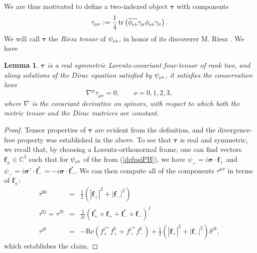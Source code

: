 \documentclass[11pt]{article}
\newtheorem{lem}[thm]{Lemma}
\theoremstyle{definition}
\DeclareMathOperator{\tr}{tr}
\newcommand{\refeq}[1]{(\ref{#1})}
\numberwithin{equation}{section}
\newcommand{\beff}{\mathbf{f}}
\newcommand{\btau}{\boldsymbol{\tau}}
\newcommand{\beq}{\begin{equation}}
\newcommand{\eeq}{\end{equation}}
\newcommand{\siV}{\boldsymbol{\sigma}}
\newcommand{\psiPH}{{\psi_{\mbox{\rm\tiny ph}}}}
\newcommand{\phiPH}{{\phi_{\mbox{\rm\tiny ph}}}}
\newcommand{\Cset}{{\mathbb C}}
\newcommand{\de}{\delta}
\newcommand{\ga}{\gamma}
\newcommand{\half}{\frac{1}{2}}
\newcommand{\bna}{\begin{eqnarray}}
\newcommand{\ena}{\end{eqnarray}}
\begin{document}
 We are thus motivated to define a two-indexed object $\boldsymbol{\tau}$ with components
\beq \label{def:tau}
\tau_{\mu\nu} := \frac{1}{4}\tr\left( \overline{\phiPH} \ga_\mu \phiPH \ga_\nu \right).
\eeq
 We will call $\btau$ the {\em Riesz tensor} of $\psiPH$, in honor of its discoverer M. Riesz \cite{Rie1946}.  
 We have
%
\begin{lem}
$\boldsymbol{\tau}$ is a real symmetric Lorentz-covariant four-tensor of rank two, and along solutions of the Dirac equation satisfied by $\psiPH$, 
it satisfies the conservation laws
\beq \label{taudivfree}
\nabla^\mu \tau_{\mu\nu} = 0,\qquad \nu = 0,1,2,3,
\eeq
where $\nabla$ is the covariant derivative on spinors, with respect to which both the metric tensor and the Dirac matrices are constant. 
\end{lem}
%
\begin{proof}
Tensor properties of $\boldsymbol{\tau}$ are evident from the definition, and the divergence-free property was established in the above. 
 To see that $\boldsymbol{\tau}$ is real and symmetric, we recall that, by choosing a Lorentz-orthonormal frame, one can find vectors 
$\beff_\pm \in \Cset^3$ such that for $\psiPH$ of the from \refeq{defpsiPH}, we have $\psi_+ = i\siV\cdot\beff_+$ and
 $\psi_- =i \siV'\cdot\beff_-^\ast = - i\siV\cdot\beff_-^\ast$. 
 We can then compute all of the components $\tau^{\mu\nu}$ in terms of $\beff_\pm$:
\bna \label{tau00}
\tau^{00} & = & \half\left( |\beff_+|^2 + |\beff_-|^2 \right) \\ \label{tau0j}
\tau^{0j} = \tau^{j0} & = & \frac{1}{2i} \left( \beff_+^\ast \times \beff_+ + \beff_-^\ast \times \beff_- \right)^j \\ \label{taujk}
\tau^{jk} & = & -\mbox{Re} \left( f_+^{j\ast} f_+^k + f_-^{j\ast}f_-^k\right)  + \half (|\beff_+|^2+|\beff_-|^2) \de^{jk},
\ena
which establishes the claim. 
\end{proof}
%
\end{document}
